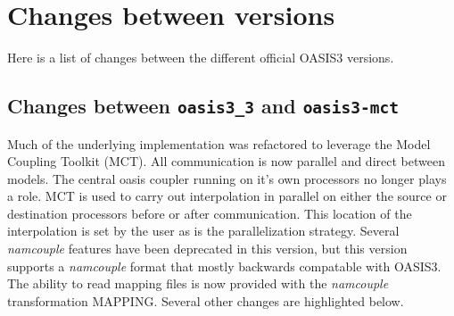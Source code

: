 \newpage

\chapter{Changes between versions}
\label{sec_changes}

Here is a list of changes between the different official OASIS3
versions.

\section{Changes between {\tt oasis3\_3} and {\tt oasis3-mct}}

Much of the underlying implementation was refactored to leverage
the Model Coupling Toolkit (MCT).  All communication is now parallel
and direct between models.  The central oasis coupler running
on it's own processors no longer plays a role.  MCT is used to
carry out interpolation in parallel on either the source or destination
processors before or after communication.  This location of the
interpolation is set by the user as is the parallelization strategy.  
Several {\it namcouple} features have been
deprecated in this version, but this version supports a {\it namcouple}
format that mostly backwards compatable with OASIS3.
The ability to read mapping files is now provided with the {\it namcouple}
transformation MAPPING.  Several other changes are highlighted below.


